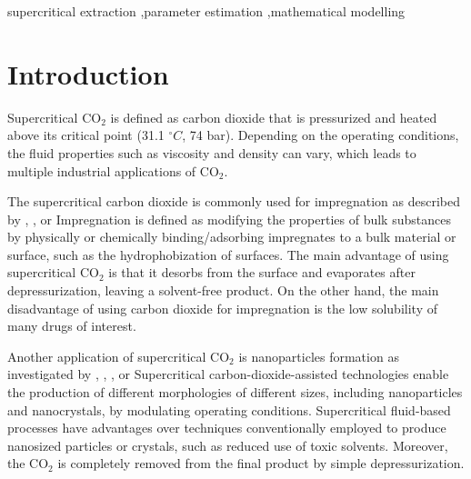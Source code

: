 \documentclass[a4paper,fleqn]{cas-dc}
\begin{document}
	\begin{keywords}
		supercritical extraction \sep parameter estimation \sep mathematical modelling
	\end{keywords}
	
	\maketitle
	
	
	\section{Introduction}
	
	Supercritical CO$_2$ is defined as carbon dioxide that is pressurized and heated above its critical point (31.1 $^\circ C$, 74 bar). Depending on the operating conditions, the fluid properties such as viscosity and density can vary, which leads to multiple industrial applications of CO$_2$.
	
	The supercritical carbon dioxide is commonly used for impregnation as described by \citet{Weidner2018}, \citet{Machado2022}, or \citet{Fathi2022} Impregnation is defined as modifying the properties of bulk substances by physically or chemically binding/adsorbing impregnates to a bulk material or surface, such as the hydrophobization of surfaces. The main advantage of using supercritical CO$_2$ is that it desorbs from the surface and evaporates after depressurization, leaving a solvent-free product. On the other hand, the main disadvantage of using carbon dioxide for impregnation is the low solubility of many drugs of interest.
	
	Another application of supercritical CO$_2$ is nanoparticles formation as investigated by \citet{Padrela2018}, \citet{Franco2021}, \citet{SaadatiArdestani2020}, or \citet{Sodeifian2022} Supercritical carbon-dioxide-assisted technologies enable the production of different morphologies of different sizes, including nanoparticles and nanocrystals, by modulating operating conditions. Supercritical fluid-based processes have advantages over techniques conventionally employed to produce nanosized particles or crystals, such as reduced use of toxic solvents. Moreover, the CO$_2$ is completely removed from the final product by simple depressurization.
	
\end{document}
